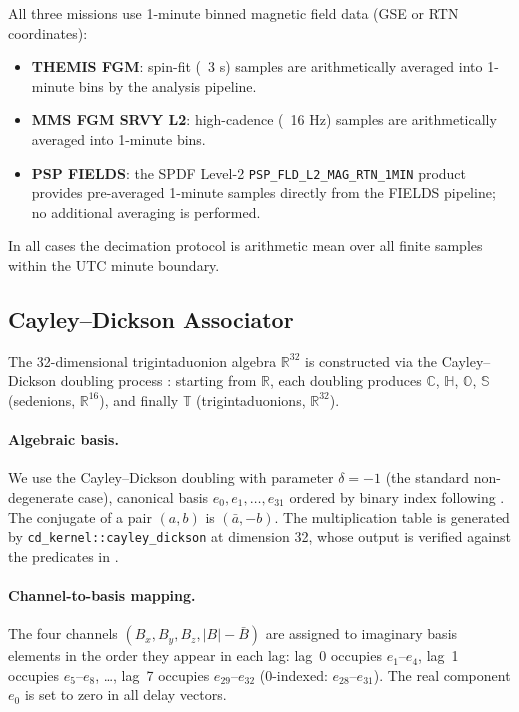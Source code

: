 \documentclass[draft]{agujournal2025}
\let\citep\cite%
\let\citet\citeA%
\begin{document}
All three missions use 1-minute binned magnetic field data (GSE or RTN
coordinates):
\begin{itemize}
  \item \textbf{THEMIS FGM}: spin-fit (~3 s) samples are arithmetically averaged
    into 1-minute bins by the analysis pipeline.
  \item \textbf{MMS FGM SRVY L2}: high-cadence (~16 Hz) samples are
    arithmetically averaged into 1-minute bins.
  \item \textbf{PSP FIELDS}: the SPDF Level-2 \texttt{PSP\_FLD\_L2\_MAG\_RTN\_1MIN}
    product provides pre-averaged 1-minute samples directly from the FIELDS
    pipeline; no additional averaging is performed.
\end{itemize}
In all cases the decimation protocol is arithmetic mean over all finite samples
within the UTC minute boundary.

\subsection{Cayley--Dickson Associator}
\label{sec:cd_associator}

The 32-dimensional trigintaduonion algebra $\mathbb{R}^{32}$ is constructed
via the Cayley--Dickson doubling process \citep{dickson1919,moreno1997}: starting from
$\mathbb{R}$, each doubling produces $\mathbb{C}$, $\mathbb{H}$, $\mathbb{O}$,
$\mathbb{S}$ (sedenions, $\mathbb{R}^{16}$), and finally $\mathbb{T}$
(trigintaduonions, $\mathbb{R}^{32}$).

\paragraph{Algebraic basis.}
We use the Cayley--Dickson doubling with parameter $\delta = -1$ (the standard
non-degenerate case), canonical basis $e_0, e_1, \ldots, e_{31}$ ordered by
binary index following \citet{demarrais2007}.  The conjugate of a pair
$(a, b)$ is $(\bar{a}, -b)$.  The multiplication table is generated by
\texttt{cd\_kernel::cayley\_dickson} at dimension 32, whose output is
verified against the predicates in \citet{moreno1997}.

\paragraph{Channel-to-basis mapping.}
The four channels $(B_x, B_y, B_z, |B|-\bar{B})$ are assigned to
imaginary basis elements in the order they appear in each lag:
lag~0 occupies $e_1$--$e_4$, lag~1 occupies $e_5$--$e_8$, \ldots,
lag~7 occupies $e_{29}$--$e_{32}$ (0-indexed: $e_{28}$--$e_{31}$).
The real component $e_0$ is set to zero in all delay vectors.
\end{document}
